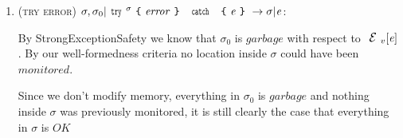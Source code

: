 \begin{enumerate}
\begin{itemize}
\end{itemize}

\item (\textsc{try error}) $\sigma,\sigma_0|\Kw{try}^\sigma\oC \mathit{error}\cC\ \Kw{catch}\ \oC\e\cC\rightarrow \sigma|\e$:

	By StrongExceptionSafety we know that $\sigma_0$ is $\mathit{garbage}$ with respect to $\ctx_v[\e]$. By our well-formedness criteria no location inside $\sigma$ could have been $monitored$.

	Since we don’t modify memory, everything in $\sigma_0$ is $\mathit{garbage}$ and nothing inside $\sigma$ was previously monitored, it is still clearly the case that everything in $\sigma$ is $\mathit{OK}$
\end{enumerate}
